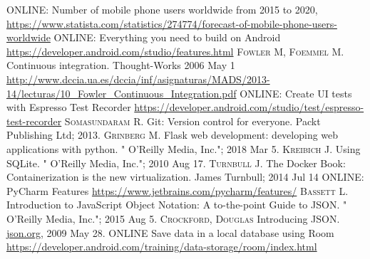 \documentclass{thesis-ekf}
\theoremstyle{definition}
\theoremstyle{remark}
\begin{document}
\begin{thebibliography}{1}
 \textsc{ONLINE}: Number of mobile phone users worldwide from 2015 to 2020, \url{https://www.statista.com/statistics/274774/forecast-of-mobile-phone-users-worldwide}
 \textsc{ONLINE}: Everything you need to build on Android \url{https://developer.android.com/studio/features.html}
 \textsc{Fowler M, Foemmel M.} Continuous integration. Thought-Works 2006 May 1 \url{http://www.dccia.ua.es/dccia/inf/asignaturas/MADS/2013-14/lecturas/10_Fowler_Continuous_Integration.pdf}
 \textsc{ONLINE}: Create UI tests with Espresso Test Recorder \url{https://developer.android.com/studio/test/espresso-test-recorder}
 \textsc{Somasundaram R.} Git: Version control for everyone. Packt Publishing Ltd; 2013.
 \textsc{Grinberg M.} Flask web development: developing web applications with python. " O'Reilly Media, Inc."; 2018 Mar 5.
 \textsc{Kreibich J.} Using SQLite. " O'Reilly Media, Inc."; 2010 Aug 17.
 \textsc{Turnbull J.} The Docker Book: Containerization is the new virtualization. James Turnbull; 2014 Jul 14
 \textsc{ONLINE}: PyCharm Features \url{https://www.jetbrains.com/pycharm/features/}
 \textsc{Bassett L.} Introduction to JavaScript Object Notation: A to-the-point Guide to JSON. " O'Reilly Media, Inc."; 2015 Aug 5.
 \textsc{Crockford, Douglas} Introducing JSON. \url{json.org}, 2009 May 28.
 \textsc{ONLINE} Save data in a local database using Room \url{https://developer.android.com/training/data-storage/room/index.html}
\end{thebibliography}
\end{document}
